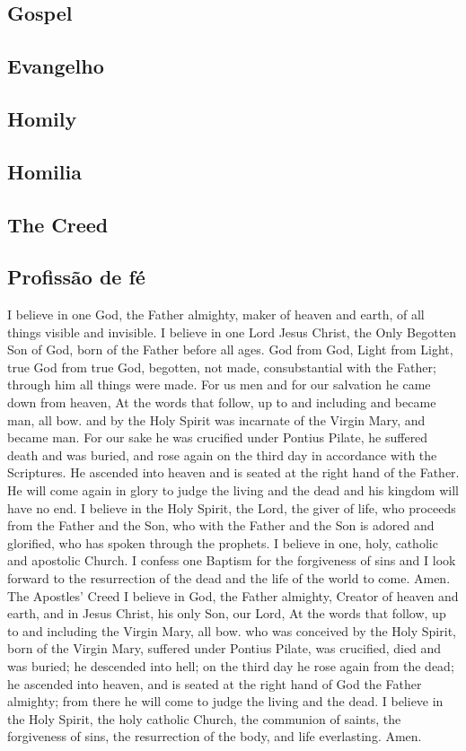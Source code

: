 \documentclass[10pt,a5]{article}
\newcommand \subsect[2] {\subsection*{#1} \switchcolumn \subsection*{#2} \switchcolumn*}
\begin{document}
\begin{paracol}{2}
 \switchcolumn

 \lipsum[3]


 \switchcolumn*

 \subsect{Gospel}{Evangelho}

 \lipsum[3]


 \switchcolumn

 \lipsum[3]


 \switchcolumn*

 \subsect{Homily}{Homilia}

 \subsect{The Creed}{Profiss\~ao de f\'e}
I believe in one God,
the Father almighty,
maker of heaven and earth,
of all things visible and invisible.
I believe in one Lord Jesus Christ,
the Only Begotten Son of God,
born of the Father before all ages.
God from God, Light from Light,
true God from true God,
begotten, not made,
consubstantial with the Father;
through him all things were made.
For us men and for our salvation
he came down from heaven,
At the words that follow, up to and including and became
man, all bow.
and by the Holy Spirit was incarnate
of the Virgin Mary,
and became man.
For our sake he was crucified
under Pontius Pilate,
he suffered death and was buried,
and rose again on the third day
in accordance with the Scriptures.
He ascended into heaven
and is seated at the right hand
of the Father.
He will come again in glory
to judge the living and the dead
and his kingdom will have no end.
I believe in the Holy Spirit,
the Lord, the giver of life,
who proceeds from the Father
and the Son,
who with the Father and the Son
is adored and glorified,
who has spoken through the prophets.
I believe in one, holy, catholic
and apostolic Church.
I confess one Baptism
for the forgiveness of sins
and I look forward to the resurrection
of the dead
and the life of the world to come. Amen.
The Apostles’ Creed
I believe in God,
the Father almighty,
Creator of heaven and earth,
and in Jesus Christ, his only Son,
our Lord,
{\tiny At the words that follow, up to and including the Virgin Mary, all bow.}
who was conceived by the Holy Spirit,
born of the Virgin Mary,
suffered under Pontius Pilate,
was crucified, died and was buried;
he descended into hell;
on the third day he rose again
from the dead;
he ascended into heaven,
and is seated at the right hand
of God the Father almighty;
from there he will come to judge
the living and the dead.
I believe in the Holy Spirit,
the holy catholic Church,
the communion of saints,
the forgiveness of sins,
the resurrection of the body,
and life everlasting. Amen.

\end{paracol}


%
\end{document}
